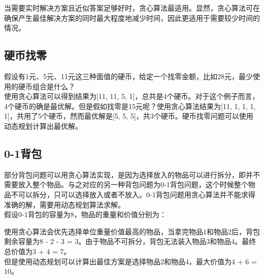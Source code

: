 当需要实时解决方案且近似答案足够好时，贪心算法最适用。显然，贪心算法可在确保产生最佳解决方案的同时最大程度地减少时间，因此更适用于需要较少时间的情况。

\subsection{硬币找零}

假设有1元、5元、11元这三种面值的硬币，给定一个找零金额，比如28元，最少使用的硬币组合是什么？ \\

使用贪心算法可以得到结果为[11, 11, 5, 1]，总共是4个硬币。对于这个例子而言，4个硬币的确是最优解。但是假如找零是15元呢？使用贪心算法结果为[11, 1, 1, 1, 1]，共用了5个硬币，然而最优解是[5, 5, 5]，共3个硬币。硬币找零问题可以使用动态规划计算出最优解。

\subsection{0-1背包}

部分背包问题可以用贪心算法实现，是因为选择放入的物品可以进行拆分，即并不需要放入整个物品。与之对应的另一种背包问题为0-1背包问题，这个时候整个物品不可以拆分，只可以选择放入或者不放入。0-1背包问题用贪心算法并不能求得准确的解，需要用动态规划算法求解。 \\

假设0-1背包的容量为8，物品的重量和价值分别为：

\begin{table}[H]
    \centering
    \caption{物品信息}
\end{table}

使用贪心算法会优先选择单位重量价值最高的物品，当拿完物品1和物品2后，背包剩余容量为8 - 2 - 3 = 3。由于物品不可拆分，背包无法装入物品3和物品4。最终总价值为3 + 4 = 7。 \\

但是使用动态规划可以计算出最佳方案是选择物品2和物品4，最大价值为4 + 6 = 10。

\newpage